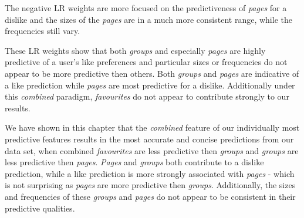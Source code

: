 The negative LR weights are more focused on the predictiveness of \emph{pages} for a dislike and the sizes of the \emph{pages} are in
a much more consistent range, while the frequencies still vary.

These LR weights show that both \emph{groups} and especially \emph{pages} are highly predictive of a user's like preferences and particular 
sizes or frequencies do not appear to be more predictive then others. Both \emph{groups} and \emph{pages} are indicative of a like prediction 
while \emph{pages} are most predictive for a dislike. Additionally under this \emph{combined} paradigm, \emph{favourites} do not appear 
to contribute strongly to our results.

We have shown in this chapter that the \emph{combined} feature of our individually most predictive features results in the most 
accurate and concise predictions from our data set, when combined \emph{favourites} are less predictive then \emph{groups} and 
\emph{groups} are less predictive then \emph{pages}. \emph{Pages} and \emph{groups} both contribute to a dislike prediction, while a like
prediction is more strongly associated with \emph{pages} - which is not surprising as \emph{pages} are more predictive then \emph{groups}.
Additionally, the sizes and frequencies of these \emph{groups} and \emph{pages} do not appear to be consistent in their predictive qualities.


